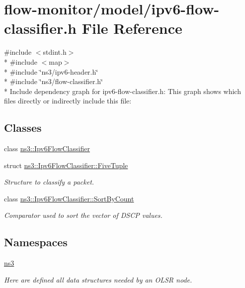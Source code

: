 \hypertarget{ipv6-flow-classifier_8h}{}\section{flow-\/monitor/model/ipv6-\/flow-\/classifier.h File Reference}
\label{ipv6-flow-classifier_8h}
{\ttfamily \#include $<$stdint.\+h$>$}\\*
{\ttfamily \#include $<$map$>$}\\*
{\ttfamily \#include \char`\"{}ns3/ipv6-\/header.\+h\char`\"{}}\\*
{\ttfamily \#include \char`\"{}ns3/flow-\/classifier.\+h\char`\"{}}\\*
Include dependency graph for ipv6-\/flow-\/classifier.h\+:
This graph shows which files directly or indirectly include this file\+:
\subsection*{Classes}
\begin{DoxyCompactItemize}
\item 
class \hyperlink{classns3_1_1Ipv6FlowClassifier}{ns3\+::\+Ipv6\+Flow\+Classifier}
\item 
struct \hyperlink{structns3_1_1Ipv6FlowClassifier_1_1FiveTuple}{ns3\+::\+Ipv6\+Flow\+Classifier\+::\+Five\+Tuple}
\begin{DoxyCompactList}\small\item\em Structure to classify a packet. \end{DoxyCompactList}\item 
class \hyperlink{classns3_1_1Ipv6FlowClassifier_1_1SortByCount}{ns3\+::\+Ipv6\+Flow\+Classifier\+::\+Sort\+By\+Count}
\begin{DoxyCompactList}\small\item\em Comparator used to sort the vector of D\+S\+CP values. \end{DoxyCompactList}\end{DoxyCompactItemize}
\subsection*{Namespaces}
\begin{DoxyCompactItemize}
\item 
 \hyperlink{namespacens3}{ns3}
\begin{DoxyCompactList}\small\item\em Here are defined all data structures needed by an O\+L\+SR node. \end{DoxyCompactList}\end{DoxyCompactItemize}
